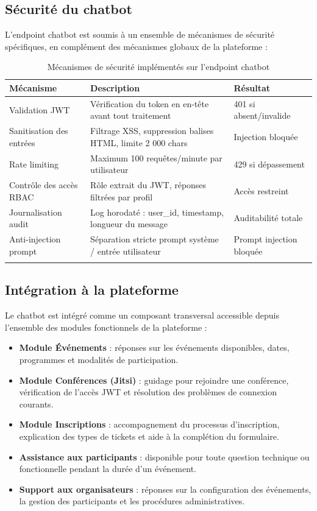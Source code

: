 \subsection{Sécurité du chatbot}
L'endpoint chatbot est soumis à un ensemble de mécanismes de sécurité spécifiques, en complément des mécanismes globaux de la plateforme :

\begin{longtable}{|m{3.5cm}|m{6cm}|m{3cm}|}
\hline
\textbf{Mécanisme} & \textbf{Description} & \textbf{Résultat} \\
\hline
\endhead
\endfoot
\endlastfoot
\hline
Validation JWT & Vérification du token en en-tête avant tout traitement & 401 si absent/invalide \\
\hline
Sanitisation des entrées & Filtrage XSS, suppression balises HTML, limite 2 000 chars & Injection bloquée \\
\hline
Rate limiting & Maximum 100 requêtes/minute par utilisateur & 429 si dépassement \\
\hline
Contrôle des accès RBAC & Rôle extrait du JWT, réponses filtrées par profil & Accès restreint \\
\hline
Journalisation audit & Log horodaté : user\_id, timestamp, longueur du message & Auditabilité totale \\
\hline
Anti-injection prompt & Séparation stricte prompt système / entrée utilisateur & Prompt injection bloquée \\
\hline
\captionsetup{justification=centering,margin=2cm}
\caption{Mécanismes de sécurité implémentés sur l'endpoint chatbot}
\label{tab:chatbot_security}
\end{longtable}

\subsection{Intégration à la plateforme}
Le chatbot est intégré comme un composant transversal accessible depuis l'ensemble des modules fonctionnels de la plateforme :
\begin{itemize}
    \item \textbf{Module Événements} : réponses sur les événements disponibles, dates, programmes et modalités de participation.
    \item \textbf{Module Conférences (Jitsi)} : guidage pour rejoindre une conférence, vérification de l'accès JWT et résolution des problèmes de connexion courants.
    \item \textbf{Module Inscriptions} : accompagnement du processus d'inscription, explication des types de tickets et aide à la complétion du formulaire.
    \item \textbf{Assistance aux participants} : disponible pour toute question technique ou fonctionnelle pendant la durée d'un événement.
    \item \textbf{Support aux organisateurs} : réponses sur la configuration des événements, la gestion des participants et les procédures administratives.
\end{itemize}

